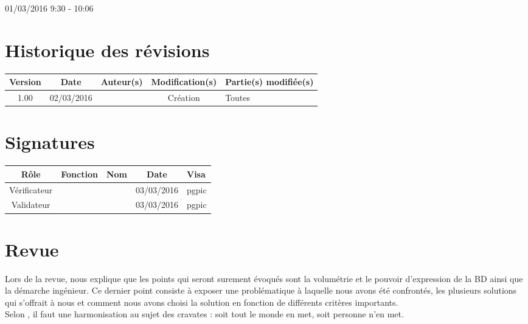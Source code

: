 \documentclass [a4paper] {article}
\begin{document}
\rhead{}

01/03/2016
\hfill   
\hfill 	9:30 - 10:06 				%



\section*{Historique des révisions}
\begin{center}
			\begin{tabular}{| c | c | c | c | p{4cm} |}
				\hline
				\rowcolor{Gray}
				Version & Date & Auteur(s) & Modification(s) & Partie(s) modifiée(s)		 \\
				\hline
				1.00 & 02/03/2016 & \Pierre & Création & Toutes \\
		\hline		
			\end{tabular}
		\end{center}

\section*{Signatures}

		\begin{center}
			\begin{tabular}{| c | c | c | c | p{4cm} |}
				\hline
				\rowcolor{Gray}
				Rôle & Fonction & Nom & Date & Visa		 \\
				\hline
				Vérificateur & \RQA & \Kafui & 03/03/2016 & pgpic \\[30pt]
				\hline
				Validateur & \CP & \Sergi & 03/03/2016 & pgpic \\[30pt]	
				\hline
			\end{tabular}
		\end{center}


\section{Revue}
Lors de la revue, \nomTuteurQualite{} nous explique que les points qui seront surement évoqués sont la volumétrie et le pouvoir d'expression de la BD ainsi que la démarche ingénieur. Ce dernier point consiste à exposer une problématique à laquelle nous avons été confrontés, les plusieurs solutions qui s'offrait à nous et comment nous avons choisi la solution en fonction de différents critères importants.\\
Selon \nomTuteurQualite{}, il faut une harmonisation au sujet des cravates : soit tout le monde en met, soit personne n'en met.
\end{document}
